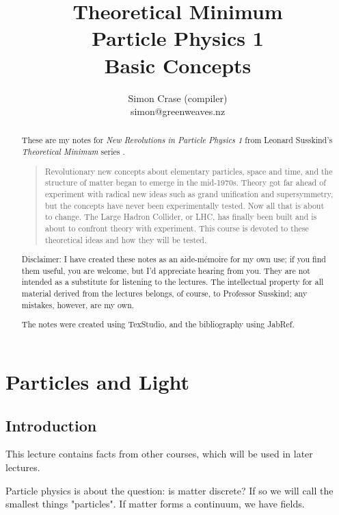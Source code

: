 \documentclass[]{article}
\title{Theoretical Minimum\\Particle Physics 1\\Basic Concepts}
\author{Simon Crase (compiler)\\simon@greenweaves.nz}
\begin{document}
\maketitle

\begin{abstract}
These are my notes for \emph{New Revolutions in Particle Physics 1}  from Leonard Susskind's \emph{Theoretical Minimum} series \cite[Particle Physics 1: Basic Concepts]{susskind2007theoretical}.

\begin{quotation}
	Revolutionary new concepts about elementary particles, space and time, and the structure of matter began to emerge in the mid-1970s. Theory got far ahead of experiment with radical new ideas such as grand unification and supersymmetry, but the concepts have never been experimentally tested. Now all that is about to change. The Large Hadron Collider, or LHC, has finally been built and is about to confront theory with experiment. This course is devoted to these theoretical ideas and how they will be tested.
\end{quotation}

Disclaimer: I have created these notes as an aide-m\'emoire for my own use; if you find them useful, you are welcome, but I'd appreciate hearing from you. They are not intended 
as a substitute for listening to the lectures. The intellectual property for all material derived from the lectures belongs, of course, to Professor Susskind; any mistakes, however, are my own.

The notes were created using TexStudio\cite{TexStudio}, and the bibliography   using JabRef\cite{Jabref}.
\end{abstract}

\tableofcontents
\listoffigures
\listoftables
\listoftheorems

\section{Particles and Light}

\subsection{Introduction}
This lecture contains  facts from other courses, which will be used in later lectures.

Particle physics is about the question: is matter discrete? If so we will call the smallest things "particles". If matter forms a continuum, we have fields.
\end{document}
